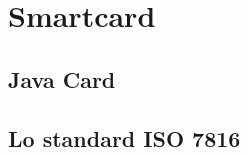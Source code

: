 \chapter{Smartcard}
\label{chapter2}
\section{Java Card}
\label{java_card}

\section{Lo standard ISO 7816}
\label{standard}
